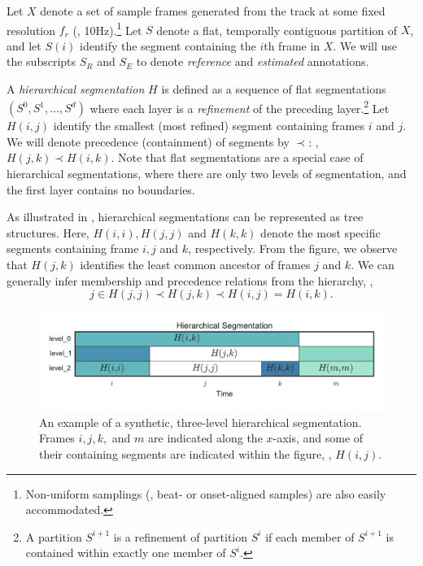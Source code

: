 \documentclass{article}
\begin{document}
Let $X$ denote a set of sample frames generated from the track at some fixed resolution $f_r$ (\eg,
10Hz).\footnote{Non-uniform samplings (\eg, beat- or onset-aligned samples) are also easily accommodated.}
Let $S $ denote a flat, temporally contiguous partition of $X$,
and let $S(i)$ identify the segment containing the $i$th frame in $X$.
We will use the subscripts $S_R$ and $S_E$ to denote \emph{reference} and \emph{estimated} annotations.

A \emph{hierarchical segmentation} $H$ is defined as a sequence of flat segmentations $(S^0, S^1, \dots, S^d)$ where each layer is a \emph{refinement}
of the preceding layer.\footnote{A partition $S^{i+1}$ is a refinement of partition $S^{i}$ if each member of $S^{i+1}$ is contained within exactly one member of $S^i$.}
Let $H(i,j)$ identify the smallest (most refined) segment containing frames $i$ and $j$.
We will denote precedence (containment) of segments by $\prec$: \eg, $H(j, k) \prec H(i, k)$.
Note that flat segmentations are a special case of hierarchical segmentations, where there are only two
levels of segmentation, and the first layer contains no boundaries.

As illustrated in , hierarchical segmentations can be represented as tree structures.
Here, $H(i, i), H(j, j)$ and $H(k,k)$ denote the most specific segments containing frame $i, j$ and $k$,
respectively.
From the figure, we observe that $H(j,k)$ identifies the least common ancestor of frames $j$ and $k$.
We can generally infer membership and precedence relations from the hierarchy, \eg,
\begin{equation}
j \in H(j, j) \prec H(j, k) \prec H(i, j) = H(i, k).
\end{equation}


\begin{figure}
  \centering
  \includegraphics[width=\columnwidth]{figs/hier-example.pdf}
  \caption{An example of a synthetic, three-level hierarchical segmentation.
  Frames $i, j, k,$ and $m$ are indicated along the $x$-axis, and some of their containing segments are indicated within the figure, \eg, $H(i, j)$.}
  \label{fig:hier-example}
\end{figure}
\end{document}
